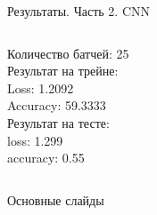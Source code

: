 \documentclass[c, aspectratio = 43]{beamer}
\begin{document}
\begin{frame}{Результаты. Часть 2. CNN}
\begin{columns}
\begin{column}{0.5\textwidth}
                   
                   Количество батчей: 25\\
                   
                   
                   Результат на трейне:\\
                   Loss: 1.2092\\
                   Accuracy: 59.3333\\
                   
                   Результат на тесте:\\
                   loss: 1.299\\
                   accuracy: 0.55\\
                   
                \end{column}
               
                \end{columns}

            
            \end{frame}



\beamertemplatenavigationsymbolsempty
\begin{frame}[noframenumbering]{Основные слайды}
	\hypertarget{toc}{}
	\tableofcontents[part=1]
\end{frame}
\end{document}
